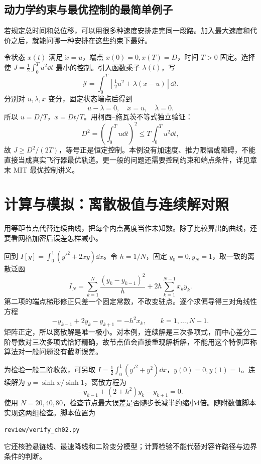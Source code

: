 \subsection{动力学约束与最优控制的最简单例子}
若规定总时间和总位移，可以用很多种速度安排走完同一段路。加入最大速度和代价之后，就能问哪一种安排在这些约束下最好。

令状态 $x(t)$ 满足 $\dot x=u$，端点 $x(0)=0,x(T)=D$，时间 $T>0$ 固定。选择使 $J=\frac12\int_0^Tu^2\dd t$ 最小的控制。引入函数乘子 $\lambda(t)$，写
\[
\mathcal J=\int_0^T\left[\tfrac12u^2+\lambda(\dot x-u)\right]\dd t.
\]
分别对 $u,\lambda,x$ 变分，固定状态端点后得到
\[
u-\lambda=0,\quad \dot x=u,\quad \dot\lambda=0.
\]
所以 $u=D/T$，$x=Dt/T$。用柯西--施瓦茨不等式独立验证：
\[
D^2=\left(\int_0^Tu\dd t\right)^2\le T\int_0^Tu^2\dd t,
\]
故 $J\ge D^2/(2T)$，等号正是恒定控制。本例没有加速度、推力限幅或障碍，不能直接当成真实飞行器最优轨道。更一般的问题还需要控制约束和端点条件，详见章末 MIT 最优控制讲义。

\section{计算与模拟：离散极值与连续解对照}
用等距节点代替连续曲线，把每个内点高度当作未知数。除了比较算出的曲线，还要看网格加密后误差怎样减小。

回到 $I[y]=\int_0^1(y'^2+2xy)\dd x$。令 $h=1/N$，固定 $y_0=0,y_N=1$，取一致的离散泛函
\[
I_N=\sum_{k=1}^N\frac{(y_k-y_{k-1})^2}{h}
+2h\sum_{k=1}^{N-1}x_ky_k.
\]
第二项的端点梯形修正只差一个固定常数，不改变驻点。逐个求偏导得三对角线性方程
\[
-y_{k-1}+2y_k-y_{k+1}=-h^2x_k,\qquad k=1,\ldots,N-1.
\]
矩阵正定，所以离散解是唯一极小。对本例，连续解是三次多项式，而中心差分二阶导数对三次多项式恰好精确，故节点值会直接重现解析解，不能用这个特例声称算法对一般问题没有截断误差。

为检验一般二阶收敛，可另取 $I=\frac12\int_0^1(y'^2+y^2)\dd x$，$y(0)=0,y(1)=1$。连续解为 $y=\sinh x/\sinh1$，离散方程为
\[
-y_{k-1}+(2+h^2)y_k-y_{k+1}=0.
\]
使用 $N=20,40,80$，检查节点最大误差是否随步长减半约缩小4倍。随附数值脚本实现这两组检查。脚本位置为
\begin{center}\texttt{review/verify\_ch02.py}\end{center}
它还核验悬链线、最速降线和二阶变分模型；计算检验不能代替对容许路径与边界条件的判断。

